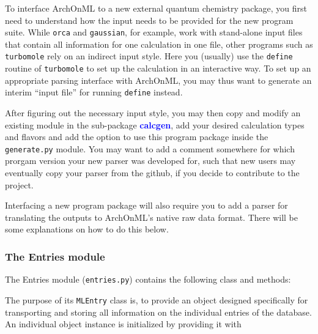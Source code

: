 \documentclass[12pt]{achemso}
\newcommand{\bl}[1]{\textcolor{blue}{\textbf{#1}}}
\begin{document}
\noindent To interface ArchOnML to a new external quantum chemistry package, you first need to understand how the input needs to be provided for the new program suite. While \texttt{orca} and \texttt{gaussian}, for example, work with stand-alone input files that contain all information for one calculation in one file, other programs such as \texttt{turbomole}\cite{Balasubramani_2020} rely on an indirect input style. Here you (usually) use the \texttt{define} routine of \texttt{turbomole} to set up the calculation in an interactive way. To set up an appropriate parsing interface with ArchOnML, you may thus want to generate an interim ``input file'' for running \texttt{define} instead.

\noindent After figuring out the necessary input style, you may then copy and modify an existing module in the sub-package \bl{calcgen}, add your desired calculation types and flavors and add the option to use this program package inside the \texttt{generate.py} module. You may want to add a comment somewhere for which prorgam version your new parser was developed for, such that new users may eventually copy your parser from the github, if you decide to contribute to the project.

\noindent Interfacing a new program package will also require you to add a parser for translating the outputs to ArchOnML's native raw data format. There will be some explanations on how to do this below.

\newpage

\subsubsection{The Entries module}

\noindent The Entries module (\texttt{entries.py}) contains the following class and methods:\\[-0.7em]

\vspace{1.0em}

\noindent The purpose of its \texttt{MLEntry} class is, to provide an object designed specifically for transporting and storing all information on the individual entries of the database. An individual object instance is initialized by providing it with
\end{document}
